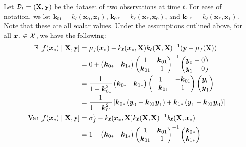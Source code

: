 \documentclass[11pt]{article}
\numberwithin{figure}{section}
\numberwithin{equation}{section}
\newcommand{\bs}[1]{\boldsymbol{#1}}
\def\bsx{\bs{x}}
\def\bsy{\bs{y}}
\def\bsk{\bs{k}}
\def\bell{\bs{\ell}}
\def\xast{\bsx_{*}}
\begin{document}
Let $\mathcal{D}_{t} = (\mathbf{X}, \mathbf{y})$ be the dataset of two observations at time $t$. For ease of notation, we let $\bsk_{01} = k_{\bell}(\bsx_{0}, \bsx_{1})$, $\bsk_{0*} = k_{\bell}(\xast, \bsx_{0})$, and $\bsk_{1*} = k_{\bell}(\xast, \bsx_{1})$. Note that these are all scalar values. Under the assumptions outlined above, for all $\xast \in \calX$, we have the following:
\begin{align*}
\expec{f(\xast) \mid \mathbf{X}, \mathbf{y}} &= \mu_{f}(\xast) + k_{\bell}(\xast, \mathbf{X})k_{\bell}(\mathbf{X}, \mathbf{X})^{-1}(\mathbf{y} - \mu_{f}(\mathbf{X}))\\
&= 0 + \begin{pmatrix}\bsk_{0*} & \bsk_{1*}\end{pmatrix}\begin{pmatrix}1 & \bsk_{01}\\ \bsk_{01} & 1\end{pmatrix}^{-1}\begin{pmatrix}\bsy_0 - 0\\ \bsy_{1} - 0\end{pmatrix}\\
&= \frac{1}{1 - \bsk_{01}^2}\begin{pmatrix}\bsk_{0*} & \bsk_{1*}\end{pmatrix}\begin{pmatrix}1 & -\bsk_{01}\\ -\bsk_{01} & 1\end{pmatrix}\begin{pmatrix}\bsy_0\\ \bsy_{1}\end{pmatrix}\\
&= \frac{1}{1 - \bsk_{01}^2}\left[\bsk_{0*}\left(\bsy_{0} - \bsk_{01}\bsy_{1}\right) + \bsk_{1*}\left(\bsy_{1} - \bsk_{01}\bsy_{0}\right)\right]\\
\var{f(\xast) \mid \mathbf{X}, \mathbf{y}} &= \sigma_{f}^{2} - k_{\bell}(\xast, \mathbf{X})k_{\bell}(\mathbf{X}, \mathbf{X})^{-1}k_{\bell}(\mathbf{X}, \xast)\\
&= 1 - \begin{pmatrix}\bsk_{0*} & \bsk_{1*}\end{pmatrix}\begin{pmatrix}1 & \bsk_{01}\\ \bsk_{01} & 1\end{pmatrix}^{-1}\begin{pmatrix}\bsk_{0*}\\ \bsk_{1*}\end{pmatrix}\\

\end{align*}
\end{document}
